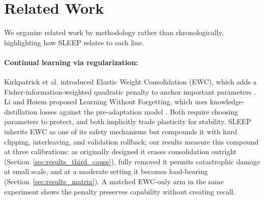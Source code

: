 
\section{Related Work}
\label{sec:related}

We organize related work by methodology rather than chronologically, highlighting how SLEEP relates to each line.

\paragraph{Continual learning via regularization:}
Kirkpatrick et al. introduced Elastic Weight Consolidation (EWC), which adds a Fisher-information-weighted quadratic penalty to anchor important parameters \citep{kirkpatrick2017overcoming}. Li and Hoiem proposed Learning Without Forgetting, which uses knowledge-distillation losses against the pre-adaptation model \citep{li2017learning}. Both require choosing parameters to protect, and both implicitly trade plasticity for stability. SLEEP inherits EWC as one of its safety mechanisms but compounds it with hard clipping, interleaving, and validation rollback; our results measure this compound at three calibrations: as originally designed it erases consolidation outright (Section~\ref{sec:results_third_cause}), fully removed it permits catastrophic damage at small scale, and at a moderate setting it becomes load-bearing (Section~\ref{sec:results_matrix}). A matched EWC-only arm in the same experiment shows the penalty preserves capability without creating recall.

